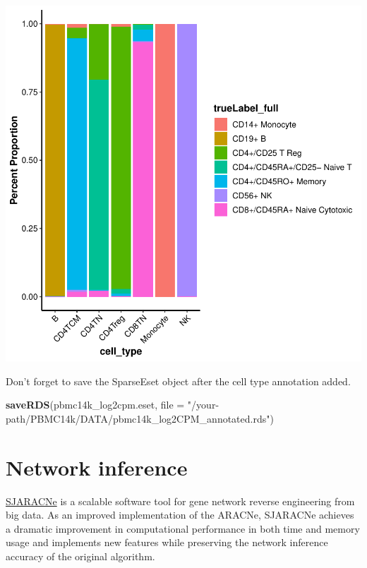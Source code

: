 \documentclass[
  12pt,
]{book}
\newenvironment{Shaded}{\begin{snugshade}}{\end{snugshade}}
\newcommand{\AttributeTok}[1]{\textcolor[rgb]{0.13,0.29,0.53}{#1}}
\newcommand{\FunctionTok}[1]{\textcolor[rgb]{0.13,0.29,0.53}{\textbf{#1}}}
\newcommand{\NormalTok}[1]{#1}
\newcommand{\StringTok}[1]{\textcolor[rgb]{0.31,0.60,0.02}{#1}}
\begin{document}
\begin{center}\includegraphics{_main_files/figure-latex/group-barplot-1} \end{center}

Don't forget to save the SparseEset object after the cell type annotation added.

\begin{Shaded}
\begin{Highlighting}[]
\FunctionTok{saveRDS}\NormalTok{(pbmc14k\_log2cpm.eset, }\AttributeTok{file =} \StringTok{"/your{-}path/PBMC14k/DATA/pbmc14k\_log2CPM\_annotated.rds"}\NormalTok{)}
\end{Highlighting}
\end{Shaded}

\chapter{Network inference}\label{network-inference}

\href{https://academic.oup.com/bioinformatics/article/35/12/2165/5156064}{SJARACNe} is a scalable software tool for gene network reverse engineering from big data. As an improved implementation of the ARACNe, SJARACNe achieves a dramatic improvement in computational performance in both time and memory usage and implements new features while preserving the network inference accuracy of the original algorithm.
\end{document}
